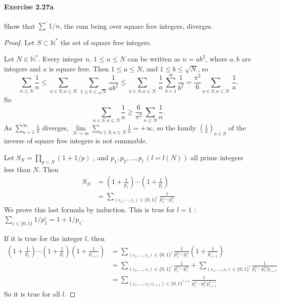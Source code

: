\documentclass{article}
\begin{document}
\paragraph{Exercise 2.27a} Show that $\sum^{\prime} 1 / n$, the sum being over square free integers, diverges.
\begin{proof}
    
Let $S \subset \mathbb{N}^*$ the set of square free integers.

Let $N \in \mathbb{N}^*$. Every integer $n, \, 1\leq n \leq N$ can be written as $n = a b^2$, where $a,b$ are integers and $a$ is square free. Then $1\leq a \leq N$, and $1\leq b \leq \sqrt{N}$, so
$$\sum_{n\leq N} \frac{1}{n} \leq \sum_{a \in S, a\leq N}\  \sum_{1\leq b \leq \sqrt{N}} \frac{1}{ab^2} \leq  \sum_{a \in S, a\leq N}\ \frac{1}{a} \, \sum_{b=1}^\infty  \frac{1}{b^2} = \frac{\pi^2}{6} \sum_{a \in S, a\leq N}\ \frac{1}{a}.$$
So $$\sum_{a \in S, a\leq N} \frac{1}{a}  \geq \frac{6}{\pi^2} \sum_{n\leq N} \frac{1}{n}.$$
As $\sum_{n=1}^\infty \frac{1}{n}$ diverges, $\lim\limits_{N \to \infty} \sum\limits_{a \in S, a\leq N} \frac{1}{a} = +\infty$, so the family $\left(\frac{1}{a}\right)_{a\in S}$ of the inverse of square free integers is not summable.

Let $S_N = \prod_{p<N}(1+1/p)$ , and $p_1,p_2,\ldots, p_l\ (l = l(N))$ all prime integers less than $N$. Then
\begin{align*}
S_N &= \left(1+\frac{1}{p_1}\right) \cdots \left(1+\frac{1}{p_l}\right)\\
&=\sum_{(\varepsilon_1,\cdots,\varepsilon_l) \in \{0,1\}^l } \frac{1}{p_1^{\varepsilon_1} \cdots p_l^{\varepsilon_l}}
\end{align*}
We prove this last formula  by induction. This is true for $l=1$ : $\sum_{\varepsilon \in \{0,1\}} 1/p_1^\varepsilon = 1 + 1/p_1$.

If it is true for the integer $l$, then 
\begin{align*}
\left(1+\frac{1}{p_1}\right) \cdots \left(1+\frac{1}{p_l}\right)\left(1+\frac{1}{p_{l+1}}\right) &= \sum_{(\varepsilon_1,\ldots,\varepsilon_l) \in \{0,1\}^l } \frac{1}{p_1^{\varepsilon_1} \cdots p_l^{\varepsilon_l}} \left(1+\frac{1}{p_{l+1}}\right)\\
&=\sum_{(\varepsilon_1,\ldots,\varepsilon_l) \in \{0,1\}^l } \frac{1}{p_1^{\varepsilon_1} \cdots p_l^{\varepsilon_l}} + \sum_{(\varepsilon_1,\ldots,\varepsilon_l) \in \{0,1\}^l } \frac{1}{p_1^{\varepsilon_1} \cdots p_l^{\varepsilon_l}p_{l+1}}\\
&=\sum_{(\varepsilon_1,\ldots,\varepsilon_l,\varepsilon_{l+1}) \in \{0,1\}^{l+1} } \frac{1}{p_1^{\varepsilon_1} \cdots p_l^{\varepsilon_l}p_{l+1}^{\varepsilon_{l+1}}} 
\end{align*}
So it is true for all $l$. 


\end{proof}
\end{document}

